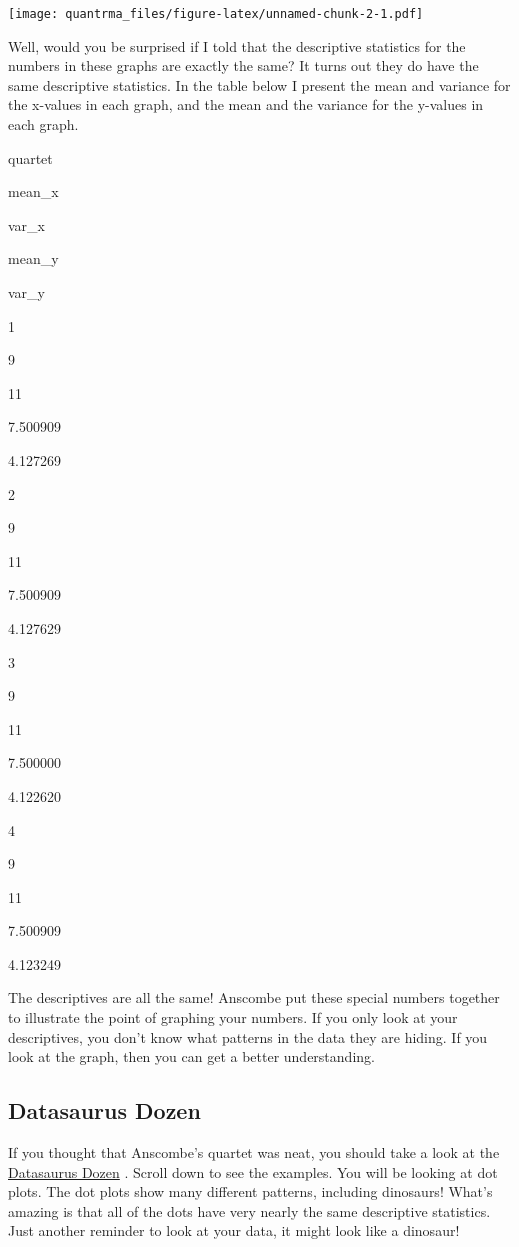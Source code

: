 \documentclass[
]{book}
\begin{document}
\texttt{[image: quantrma\_files/figure-latex/unnamed-chunk-2-1.pdf]}

Well, would you be surprised if I told that the descriptive statistics for the numbers in these graphs are exactly the same? It turns out they do have the same descriptive statistics. In the table below I present the mean and variance for the x-values in each graph, and the mean and the variance for the y-values in each graph.

quartet

mean\_x

var\_x

mean\_y

var\_y

1

9

11

7.500909

4.127269

2

9

11

7.500909

4.127629

3

9

11

7.500000

4.122620

4

9

11

7.500909

4.123249

The descriptives are all the same! Anscombe put these special numbers together to illustrate the point of graphing your numbers. If you only look at your descriptives, you don't know what patterns in the data they are hiding. If you look at the graph, then you can get a better understanding.

\hypertarget{datasaurus-dozen}{%
\subsection{Datasaurus Dozen}\label{datasaurus-dozen}}

If you thought that Anscombe's quartet was neat, you should take a look at the \href{https://www.autodeskresearch.com/publications/samestats}{Datasaurus Dozen} \citep{matejka2017same}. Scroll down to see the examples. You will be looking at dot plots. The dot plots show many different patterns, including dinosaurs! What's amazing is that all of the dots have very nearly the same descriptive statistics. Just another reminder to look at your data, it might look like a dinosaur!
\end{document}
